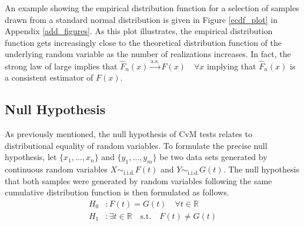 \documentclass[12pt, a4paper]{article}
\theoremstyle{MAstyle} \newtheorem{assumption}{Assumption}[section]
\theoremstyle{MAstyle} \newtheorem{definition}{Definition}[section]
\theoremstyle{MAstyle} \newtheorem{theorem}{Theorem}[section]
\begin{document}
			An example showing the empirical distribution function for a selection of samples drawn from a standard normal distribution is given in Figure \ref{ecdf_plot} in Appendix \ref{add_figures}. As this plot illustrates, the empirical distribution function gets increasingly close to the theoretical distribution function of the underlying random variable as the number of realizations increases. In fact, the strong law of large implies that $\hat{F}_n(x) \stackrel{\text{a.s.}}{\rightarrow} F(x) \quad  \forall x$ implying that $\hat{F}_n(x)$ is a consistent estimator of $F(x)$.
			
		\subsection{Null Hypothesis}
			As previously mentioned, the null hypothesis of CvM tests relates to distributional equality of random variables. 
			To formulate the precise null hypothesis, let $\{x_1, \dots , x_n\}$ and $\{y_1, \dots , y_m\}$ be two data sets generated by continuous random variables $X \sim_{\text{i.i.d.}} F(t)$ and $Y \sim_{\text{i.i.d.}} G(t)$.
			The null hypothesis that both samples were generated by random variables following the same cumulative distribution function is then formulated as follows.
			\begin{equation}
				\begin{split}
					H_0&: F(t) = G(t) \quad \forall t \in \mathbb{R}\\
					H_1&: \exists t \in \mathbb{R} \quad \text{s.t.} \quad F(t) \neq G(t)
				\end{split}
			\end{equation}
				
			
\end{document}
